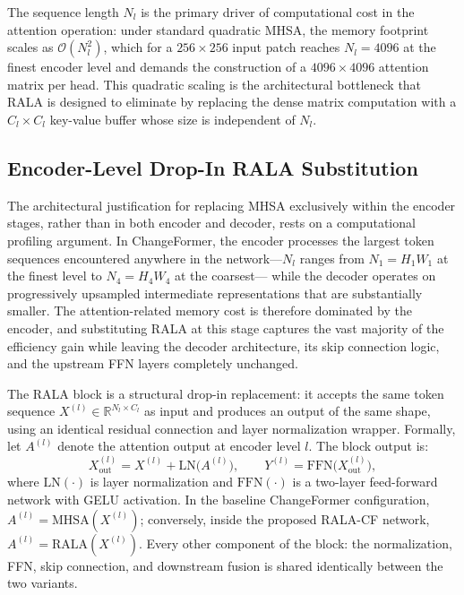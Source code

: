 The sequence length $N_l$ is the primary driver of computational cost in the
attention operation: under standard quadratic MHSA, the memory footprint scales
as $\mathcal{O}(N_l^2)$, which for a $256 \times 256$ input patch reaches
$N_l = 4096$ at the finest encoder level and demands the construction of a
$4096 \times 4096$ attention matrix per head. This quadratic scaling is the
architectural bottleneck that RALA is designed to eliminate by replacing the
dense matrix computation with a $C_l \times C_l$ key-value buffer whose size
is independent of $N_l$.

\subsection{Encoder-Level Drop-In RALA Substitution}
\label{subsec:rala-substitution}

The architectural justification for replacing MHSA exclusively within the
encoder stages, rather than in both encoder and decoder, rests on a
computational profiling argument. In ChangeFormer, the encoder processes the
largest token sequences encountered anywhere in the network---$N_l$ ranges
from $N_1 = H_1 W_1$ at the finest level to $N_4 = H_4 W_4$ at the coarsest---
while the decoder operates on progressively upsampled intermediate
representations that are substantially smaller. The attention-related memory
cost is therefore dominated by the encoder, and substituting RALA at this
stage captures the vast majority of the efficiency gain while leaving the
decoder architecture, its skip connection logic, and the upstream FFN layers
completely unchanged.

The RALA block is a structural drop-in replacement: it accepts the same
token sequence $X^{(l)} \in \mathbb{R}^{N_l \times C_l}$ as input and
produces an output of the same shape, using an identical residual connection
and layer normalization wrapper. Formally, let $A^{(l)}$ denote the attention
output at encoder level $l$. The block output is:
\begin{equation}
X_{\mathrm{out}}^{(l)} = X^{(l)} + \mathrm{LN}\bigl(A^{(l)}\bigr),
\qquad
Y^{(l)} = \mathrm{FFN}\!\bigl(X_{\mathrm{out}}^{(l)}\bigr),
\label{eq:residual_ffn}
\end{equation}
where $\mathrm{LN}(\cdot)$ is layer normalization and $\mathrm{FFN}(\cdot)$
is a two-layer feed-forward network with GELU activation. In the baseline ChangeFormer configuration, $A^{(l)} = \mathrm{MHSA}(X^{(l)})$; conversely, inside the proposed \ac{RALA-CF} network, $A^{(l)} = \mathrm{RALA}(X^{(l)})$. Every other component of the block: the normalization, FFN, skip connection, and downstream fusion is shared identically between the two variants.

